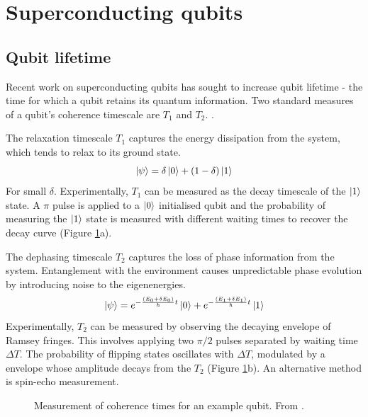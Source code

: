 \documentclass[11pt]{article}
\begin{document}
\section{Superconducting qubits}



\subsection{Qubit lifetime}

Recent work on superconducting qubits has sought to increase qubit lifetime - the time for which a qubit retains its quantum information. Two standard measures of a qubit's coherence timescale are $T_1$ and $T_2$. \cite{schuster2007circuit}.

The relaxation timescale $T_1$ captures the energy dissipation from the system, which tends to relax to its ground state.
\begin{equation}
\ket{\psi} = \delta \ket{0} + (1-\delta) \ket{1}
\end{equation}
For small $\delta$. Experimentally, $T_1$ can be measured as the decay timescale of the $\ket{1}$ state. A $\pi$ pulse is applied to a $\ket{0}$ initialised qubit and the probability of measuring the $\ket{1}$ state is measured with different waiting times to recover the decay curve (Figure \ref{fig_coherence}a). 

The dephasing timescale $T_2$ captures the loss of phase information from the system. Entanglement with the environment causes unpredictable phase evolution by introducing noise to the eigenenergies.
\begin{equation}
\ket{\psi} = e^{-\frac{(E_0 + \delta E_0)}{\hbar} t} \ket{0} + e^{-\frac{(E_1 + \delta E_1)}{\hbar} t} \ket{1}
\end{equation}
Experimentally, $T_2$ can be measured by observing the decaying envelope of Ramsey fringes. This involves applying two $\pi/2$ pulses separated by waiting time $\Delta T$. The probability of flipping states oscillates with $\Delta T$, modulated by a envelope whose amplitude decays from the $T_2$ (Figure \ref{fig_coherence}b). An alternative method is spin-echo measurement.

\begin{figure}[H]
	\centering
	\caption{Measurement of coherence times for an example qubit. From \cite{scarlino2017all}.}
	\label{fig_coherence}
\end{figure}
\end{document}
